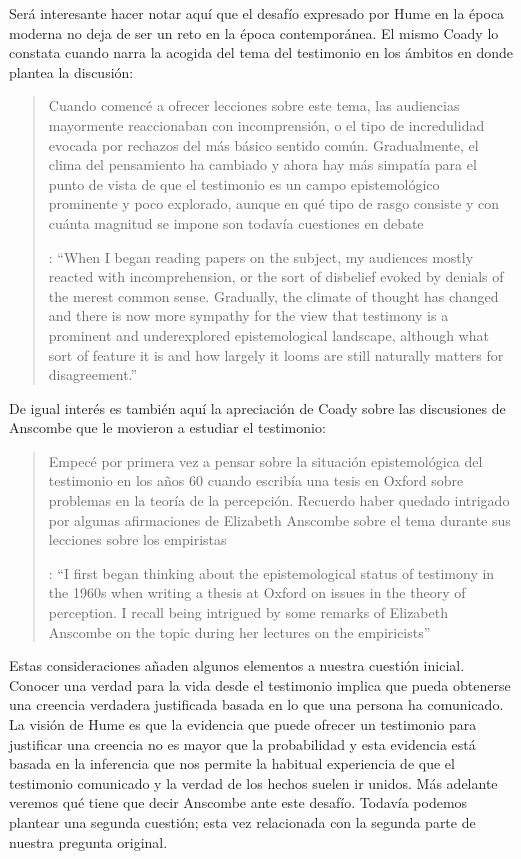 Será interesante hacer notar aquí que el desafío expresado por Hume en la época moderna no deja de ser un reto en la época contemporánea. El mismo Coady lo constata cuando narra la acogida del tema del testimonio en los ámbitos en donde plantea la discusión: \blockquote[{\cite[vii]{coady1992test}}: \enquote{When I began reading papers on the subject, my audiences mostly reacted with incomprehension, or the sort of disbelief evoked by denials of the merest common sense. Gradually, the climate of thought has changed and there is now more sympathy for the view that testimony is a prominent and underexplored epistemological landscape, although what sort of feature it is and how largely it looms are still naturally matters for disagreement.}]{Cuando comencé a ofrecer lecciones sobre este tema, las audiencias mayormente reaccionaban con incomprensión, o el tipo de incredulidad evocada por rechazos del más básico sentido común. Gradualmente, el clima del pensamiento ha cambiado y ahora hay más simpatía para el punto de vista de que el testimonio es un campo epistemológico prominente y poco explorado, aunque en qué tipo de rasgo consiste y con cuánta magnitud se impone son todavía cuestiones en debate}. De igual interés es también aquí la apreciación de Coady sobre las discusiones de Anscombe que le movieron a estudiar el testimonio: \blockquote[{\cite[vii]{coady1992test}}: \enquote{I first began thinking about the epistemological status of testimony in the 1960s when writing a thesis at Oxford on issues in the theory of perception. \textelp{} I recall being intrigued by some remarks of Elizabeth Anscombe on the topic during her lectures on the empiricists}]{Empecé por primera vez a pensar sobre la situación epistemológica del testimonio en los años 60 cuando escribía una tesis en Oxford sobre problemas en la teoría de la percepción. \textelp{} Recuerdo haber quedado intrigado por algunas afirmaciones de Elizabeth Anscombe sobre el tema durante sus lecciones sobre los empiristas}

Estas consideraciones añaden algunos elementos a nuestra cuestión inicial. Conocer una verdad para la vida desde el testimonio implica que pueda obtenerse una creencia verdadera justificada basada en lo que una persona ha comunicado. La visión de Hume es que la evidencia que puede ofrecer un testimonio para justificar una creencia no es mayor que la probabilidad y esta evidencia está basada en la inferencia que nos permite la habitual experiencia de que el testimonio comunicado y la verdad de los hechos suelen ir unidos. Más adelante veremos qué tiene que decir Anscombe ante este desafío. Todavía podemos plantear una segunda cuestión; esta vez relacionada con la segunda parte de nuestra pregunta original.


